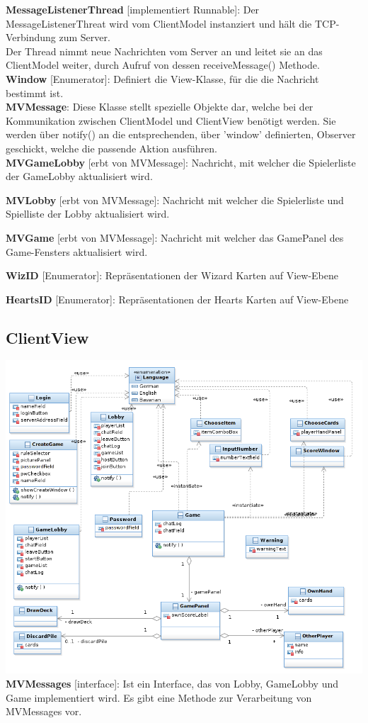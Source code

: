 \documentclass{article}
\begin{document}
\textbf{MessageListenerThread} [implementiert Runnable]: Der MessageListenerThreat wird vom ClientModel instanziert und hält die TCP-Verbindung zum Server. \\
Der Thread nimmt neue Nachrichten vom Server an und leitet sie an das ClientModel weiter, durch Aufruf von dessen receiveMessage() Methode.\\

\textbf{Window} [Enumerator]: Definiert die View-Klasse, für die die Nachricht bestimmt ist. \\

\textbf{MVMessage}: Diese Klasse stellt spezielle Objekte dar, welche bei der Kommunikation zwischen ClientModel und ClientView benötigt werden. Sie werden über notify() an die entsprechenden, über 'window' definierten, Observer geschickt, welche die passende Aktion ausführen. \\

\textbf{MVGameLobby} [erbt von MVMessage]: Nachricht, mit welcher die Spielerliste der GameLobby aktualisiert wird.

\textbf{MVLobby} [erbt von MVMessage]: Nachricht mit welcher die Spielerliste und Spielliste der Lobby aktualisiert wird.

\textbf{MVGame} [erbt von MVMessage]: Nachricht mit welcher das GamePanel des Game-Fensters aktualisiert wird.

\textbf{WizID} [Enumerator]: Repräsentationen der Wizard Karten auf View-Ebene

\textbf{HeartsID} [Enumerator]: Repräsentationen der Hearts Karten auf View-Ebene

\subsection{ClientView}
\includegraphics[width=\textwidth]{Entwurf_ViewDiagram}
\textbf{MVMessages} [interface]:  Ist ein Interface, das von Lobby, GameLobby und Game implementiert wird. Es gibt eine Methode zur Verarbeitung von MVMessages vor. \\
\end{document}
